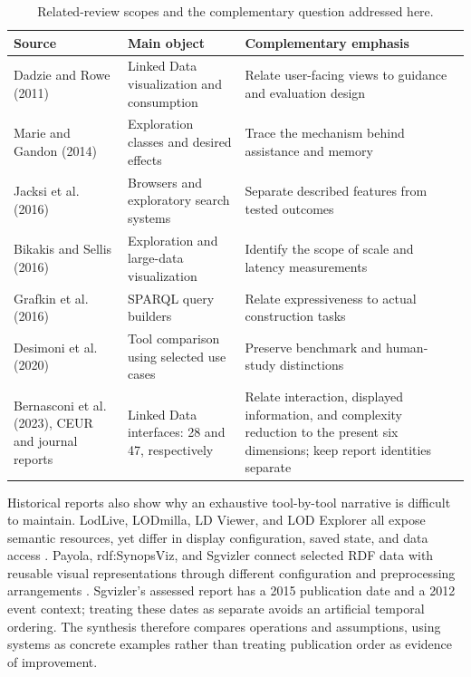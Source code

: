 \documentclass[manuscript,review,screen]{acmart}
\begin{document}
\begin{table}[htbp]
\centering\small
\caption{Related-review scopes and the complementary question addressed here.}
\label{tab:related}
\begin{tabularx}{\linewidth}{L{34mm} Y Y}
\toprule Source & Main object & Complementary emphasis\\\midrule
Dadzie and Rowe (2011) & Linked Data visualization and consumption & Relate user-facing views to guidance and evaluation design\\
Marie and Gandon (2014) & Exploration classes and desired effects & Trace the mechanism behind assistance and memory\\
Jacksi et al. (2016) & Browsers and exploratory search systems & Separate described features from tested outcomes\\
Bikakis and Sellis (2016) & Exploration and large-data visualization & Identify the scope of scale and latency measurements\\
Grafkin et al. (2016) & SPARQL query builders & Relate expressiveness to actual construction tasks\\
Desimoni et al. (2020) & Tool comparison using selected use cases & Preserve benchmark and human-study distinctions\\
Bernasconi et al. (2023), CEUR and journal reports & Linked Data interfaces: 28 and 47, respectively & Relate interaction, displayed information, and complexity reduction to the present six dimensions; keep report identities separate\\\bottomrule
\end{tabularx}
\end{table}

Historical reports also show why an exhaustive tool-by-tool narrative is difficult to maintain. LodLive, LODmilla, LD Viewer, and LOD Explorer all expose semantic resources, yet differ in display configuration, saved state, and data access \citep{2012_Camarda_LodLive_exploring,2014_AMA_LODmilla_Shared,2014_Lukovnikov_LD_Viewer,2018_Jacksi_LOD_Explorer}. Payola, rdf:SynopsViz, and Sgvizler connect selected RDF data with reusable visual representations through different configuration and preprocessing arrangements \citep{2013_Klimek_Payola_collaborative,2014_Bikakis_rdfSynopsViz_a,2015_Skjaeveland_Sgvizler_a}. Sgvizler's assessed report has a 2015 publication date and a 2012 event context; treating these dates as separate avoids an artificial temporal ordering. The synthesis therefore compares operations and assumptions, using systems as concrete examples rather than treating publication order as evidence of improvement.
\end{document}
